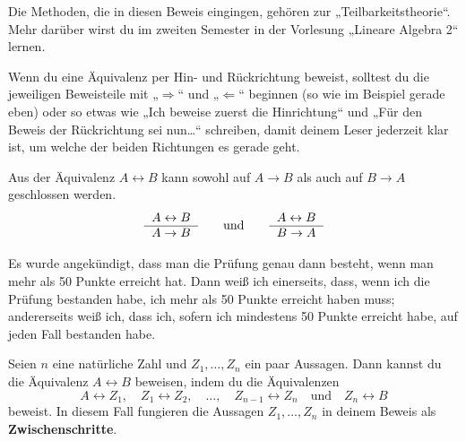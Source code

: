 \begin{bem}
    Die Methoden, die in diesen Beweis eingingen, gehören zur „Teilbarkeitstheorie“. Mehr darüber wirst du im zweiten Semester in der Vorlesung „Lineare Algebra 2“ lernen.
\end{bem}


\begin{bem}
    Wenn du eine Äquivalenz per Hin- und Rückrichtung beweist, solltest du die jeweiligen Beweisteile mit „$\Rightarrow$“ und „$\Leftarrow$“ beginnen (so wie im Beispiel gerade eben) oder so etwas wie „Ich beweise zuerst die Hinrichtung“ und „Für den Beweis der Rückrichtung sei nun\dots“ schreiben, damit deinem Leser jederzeit klar ist, um welche der beiden Richtungen es gerade geht.
\end{bem}


\begin{axiom}
    Aus der Äquivalenz $A\leftrightarrow B$ kann sowohl auf $A\to B$ als auch auf $B\to A$ geschlossen werden.
    \[\begin{tabular}{r}
        $A\leftrightarrow B$ \\
        \hline 
        $A\to B$ 
    \end{tabular} \qquad\text{und}\qquad \begin{tabular}{r}
        $A\leftrightarrow B$ \\
        \hline 
        $B\to A$ 
    \end{tabular}\]
\end{axiom}


\begin{bsp}
    Es wurde angekündigt, dass man die Prüfung genau dann besteht, wenn man mehr als 50 Punkte erreicht hat. Dann weiß ich einerseits, dass, wenn ich die Prüfung bestanden habe, ich mehr als 50 Punkte erreicht haben muss; andererseits weiß ich, dass ich, sofern ich mindestens 50 Punkte erreicht habe, auf jeden Fall bestanden habe.
\end{bsp}


\begin{satz} \label{ifftrans}
    Seien $n$ eine natürliche Zahl und $Z_1,\dots , Z_n$ ein paar Aussagen. Dann kannst du die Äquivalenz $A\leftrightarrow B$ beweisen, indem du die Äquivalenzen
        \[ A\leftrightarrow Z_1,\quad Z_1\leftrightarrow Z_2,\quad \dots,\quad Z_{n-1}\leftrightarrow Z_n \quad\text{und}\quad Z_n\leftrightarrow B \]
    beweist. In diesem Fall fungieren die Aussagen $Z_1,\dots , Z_n$ in deinem Beweis als \textbf{Zwischenschritte}.
\end{satz}


